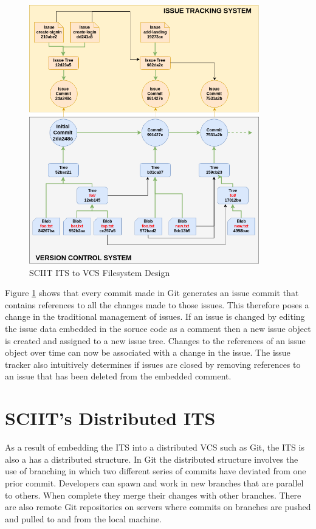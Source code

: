 \documentclass{mproj}
\begin{document}
\begin{figure}[t]
\caption{SCIIT ITS to VCS Filesystem Design}
\label{fig:sciit-filesystem}
\centering
\includegraphics[width=10cm]{sciit-filesystem}
\end{figure}

Figure \ref{fig:sciit-filesystem} shows that every commit made in Git generates an issue commit that contains references to all the changes made to those issues. This therefore poses a change in the traditional management of issues. If an issue is changed by editing the issue data embedded in the soruce code as a comment then a new issue object is created and assigned to a new issue tree. Changes to the references of an issue object over time can now be associated with a change in the issue. The issue tracker also intuitively determines if issues are closed by removing references to an issue that has been deleted from the embedded comment.









\section{SCIIT's Distributed ITS}

As a result of embedding the ITS into a distributed VCS such as Git, the ITS is also a has a distributed structure. In Git the distributed structure involves the use of branching in which two different series of commits have deviated from one prior commit. Developers can spawn and work in new branches that are parallel to others. When complete they merge their changes with other branches. There are also remote Git repositories on servers where commits on branches are pushed and pulled to and from the local machine. 
\end{document}
